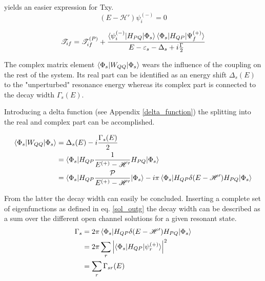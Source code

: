 yields an easier expression for Txy.
\begin{equation}
  (E - \mathscr{H}') \psi_i^{(-)} = 0
\end{equation}

\begin{equation}
  \mathscr{T}_{if} = \mathscr{T}_{if}^{(P)} + 
                     \frac{\braket{\psi_i^{(-)}|H_{PQ}|\Phi_s}
                           \braket{\Phi_s|H_{QP}|\Psi_f^{(+)}}}
                          {E-\varepsilon_s - \Delta_s + i \frac{\Gamma}{2}}
\end{equation}

The complex matrix element $\braket{\Phi_s|W_{QQ}|\Phi_s}$ wears the influence
of the coupling on the rest of the system. Its real part can be identified as
an energy shift $\Delta_s(E)$ to the "unperturbed" resonance energy whereas its
complex part is connected to the decay width $\Gamma_s(E)$.

Introducing a delta function (see Appendix \ref{delta_function}) the splitting into the real and complex part can be accomplished.

\begin{align}
  \braket{\Phi_s|W_{QQ}|\Phi_s} & = \Delta_s(E) - i \frac{\Gamma_s(E)}{2}\\
                                & = \braket{\Phi_s|H_{QP}
                                    \frac{1}{E^{(+)}  - \mathscr{H}'}H_{PQ}|\Phi_s}\\
                                & = \braket{\Phi_s|H_{QP}
                                    \frac{\mathcal{P}}{E^{(+)} - \mathscr{H}'}|\Phi_s}
                                    - i\pi \braket{\Phi_s|H_{QP}\delta(E-\mathscr{H}')H_{PQ}
                                    |\Phi_s}
\end{align}



From the latter the decay width can easily be concluded. Inserting a complete set
of eigenfunctions as defined in eq. \ref{sol_outg} the decay width can be described
as a sum over the different open channel solutions for a given resonant state.
\begin{align}
  \Gamma_s & = 2 \pi \braket{\Phi_s|H_{QP}\delta(E-\mathscr{H}')H_{PQ}|\Phi_s}\\
           & = 2 \pi \sum\limits_r \left | \braket{\Phi_s|H_{QP}|\psi_r^{(+)}} \right|^2\\
           & = \sum\limits_r \Gamma_{sr}(E)
\end{align}

